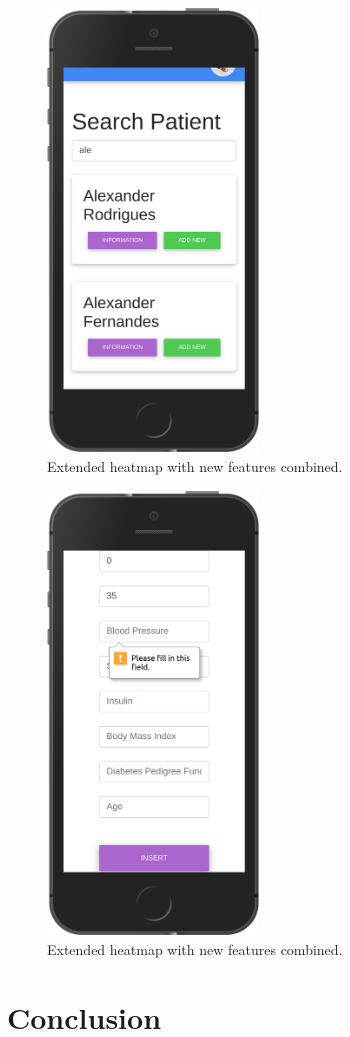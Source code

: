 \documentclass[12pt]{article}
\begin{document}
\begin{figure}[ht]
\centering
\includegraphics[width=0.5\textwidth]{7se.png}
\caption{\label{fig:56} Extended heatmap with new features combined.}
\end{figure}
\begin{figure}[ht]
\centering
\includegraphics[width=0.5\textwidth]{8se.png}
\caption{\label{fig:57} Extended heatmap with new features combined.}
\end{figure}

\clearpage
\newpage
\section{Conclusion}


\newpage
\nocite{*}
 

\end{document}
